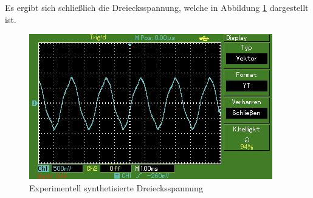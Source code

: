 Es ergibt sich schließlich die Dreiecksspannung, welche in Abbildung \ref{fig:Ex3}
dargestellt ist.

\begin{figure}[H]
    \centering
    \includegraphics[scale=0.7]{content/sinus.jpg}
    \caption{Experimentell synthetisierte Dreiecksspannung}
    \label{fig:Ex3}
\end{figure}




